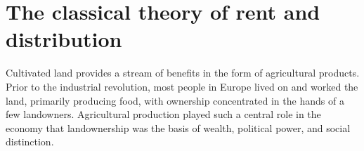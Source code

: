  
 
\section{The classical theory of rent and distribution}
Cultivated land provides a stream of benefits in the form of agricultural products.
Prior to the industrial revolution, most people in Europe lived on and worked the land, primarily producing food, with ownership concentrated in the hands of a few landowners.  Agricultural production played such a central role in the economy that landownership was the basis of wealth, political power, and social distinction.   

